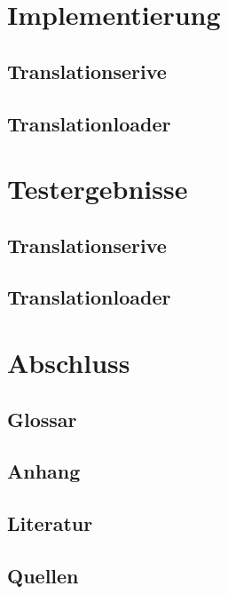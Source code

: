 \documentclass[12pt,a4paper,oneside]{article}
\begin{document}
    \section{Implementierung}
    \subsection{Translationserive}
    \subsection{Translationloader}
    \section{Testergebnisse}
    \subsection{Translationserive}
    \subsection{Translationloader}
    \section{Abschluss}
    \subsection{Glossar}
    \subsection{Anhang}
    \subsection{Literatur}
    \subsection{Quellen}
\end{document}

